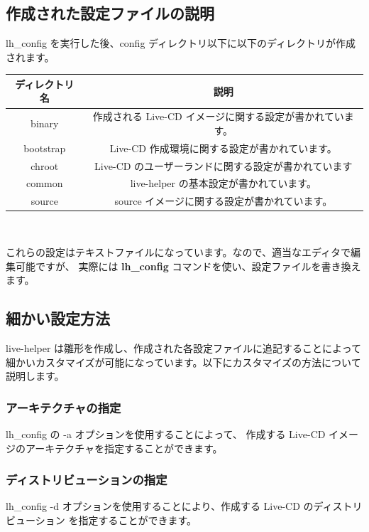 \documentclass[mingoth,a4paper]{jsarticle}
\begin{document}
\subsection{作成された設定ファイルの説明}
lh\_config を実行した後、config ディレクトリ以下に以下のディレクトリが作成されます。
\begin{center}
\begin{tabular}{|c|c|}
\hline
ディレクトリ名 & 説明 \\ \hline \hline
binary & 作成される Live-CD イメージに関する設定が書かれています。\\ \hline
bootstrap & Live-CD 作成環境に関する設定が書かれています。\\ \hline
chroot & Live-CD のユーザーランドに関する設定が書かれています\\ \hline
common & live-helper の基本設定が書かれています。\\ \hline
source & source イメージに関する設定が書かれています。\\ \hline
\end{tabular}\\
\end{center}

これらの設定はテキストファイルになっています。なので、適当なエディタで編集可能ですが、
実際には {\bf lh\_config} コマンドを使い、設定ファイルを書き換えます。


\subsection{細かい設定方法}
live-helper は雛形を作成し、作成された各設定ファイルに追記することによって
細かいカスタマイズが可能になっています。以下にカスタマイズの方法について説明します。

\subsubsection{アーキテクチャの指定}

lh\_config の -a オプションを使用することによって、
作成する Live-CD イメージのアーキテクチャを指定することができます。

\begin{commandline}
\end{commandline}

\subsubsection{ディストリビューションの指定}
lh\_config -d オプションを使用することにより、作成する Live-CD のディストリビューション
を指定することができます。
\end{document}
